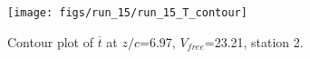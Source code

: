 \begin{figure}[H]
\centering
\texttt{[image: figs/run\_15/run\_15\_T\_contour]}
\caption{Contour plot of $\overline{t}$ at $z/c$=6.97, $V_{free}$=23.21, station 2.}
\label{fig:run_15_T_contour}
\end{figure}


